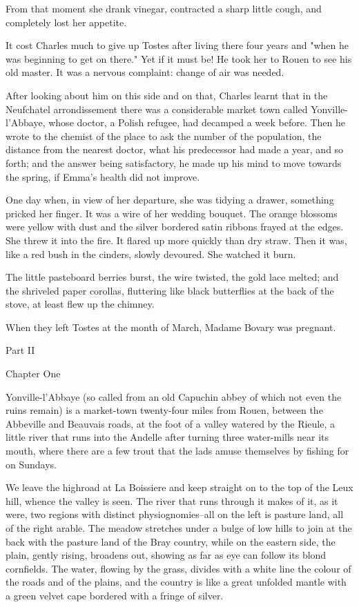 \documentclass{tufte-book}
\begin{document}
From that moment she drank vinegar, contracted a sharp little cough, and
completely lost her appetite.

It cost Charles much to give up Tostes after living there four years and
"when he was beginning to get on there." Yet if it must be! He took her
to Rouen to see his old master. It was a nervous complaint: change of
air was needed.

After looking about him on this side and on that, Charles learnt that
in the Neufchatel arrondissement there was a considerable market town
called Yonville-l'Abbaye, whose doctor, a Polish refugee, had decamped a
week before. Then he wrote to the chemist of the place to ask the
number of the population, the distance from the nearest doctor, what
his predecessor had made a year, and so forth; and the answer being
satisfactory, he made up his mind to move towards the spring, if Emma's
health did not improve.

One day when, in view of her departure, she was tidying a drawer,
something pricked her finger. It was a wire of her wedding bouquet.
The orange blossoms were yellow with dust and the silver bordered satin
ribbons frayed at the edges. She threw it into the fire. It flared
up more quickly than dry straw. Then it was, like a red bush in the
cinders, slowly devoured. She watched it burn.

The little pasteboard berries burst, the wire twisted, the gold
lace melted; and the shriveled paper corollas, fluttering like black
butterflies at the back of the stove, at least flew up the chimney.

When they left Tostes at the month of March, Madame Bovary was pregnant.





Part II



Chapter One

Yonville-l'Abbaye (so called from an old Capuchin abbey of which not
even the ruins remain) is a market-town twenty-four miles from Rouen,
between the Abbeville and Beauvais roads, at the foot of a valley
watered by the Rieule, a little river that runs into the Andelle after
turning three water-mills near its mouth, where there are a few trout
that the lads amuse themselves by fishing for on Sundays.

We leave the highroad at La Boissiere and keep straight on to the top of
the Leux hill, whence the valley is seen. The river that runs through it
makes of it, as it were, two regions with distinct physiognomies--all on
the left is pasture land, all of the right arable. The meadow stretches
under a bulge of low hills to join at the back with the pasture land of
the Bray country, while on the eastern side, the plain, gently rising,
broadens out, showing as far as eye can follow its blond cornfields. The
water, flowing by the grass, divides with a white line the colour of the
roads and of the plains, and the country is like a great unfolded mantle
with a green velvet cape bordered with a fringe of silver.
\end{document}
